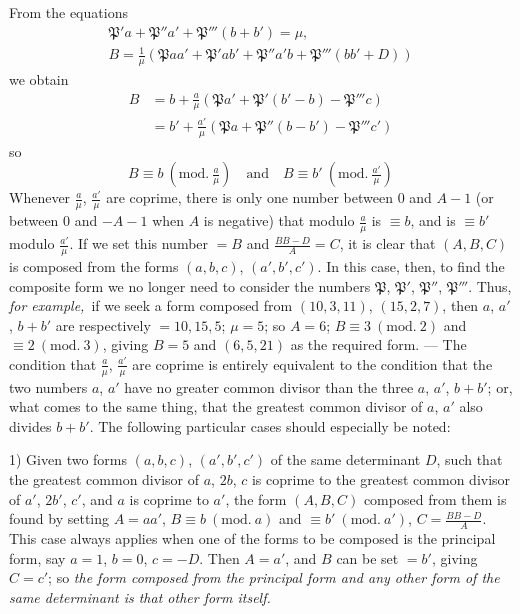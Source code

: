 From the equations
\[
\begin{gathered}\mathfrak{P}'a+\mathfrak{P}''a'+\mathfrak{P}'''(b+b')=\mu,\\
B=\frac{1}{\mu}(\mathfrak{P}aa'+\mathfrak{P}'ab'+\mathfrak{P}''a'b+\mathfrak{P}'''(bb'+D))\end{gathered}
\]
we obtain
\[
\begin{aligned}B&=b+\frac{a}{\mu}(\mathfrak{P}a'+\mathfrak{P}'(b'-b)-\mathfrak{P}'''c)\\&=b'+\frac{a'}{\mu}(\mathfrak{P}a+\mathfrak{P}''(b-b')-\mathfrak{P}'''c')\end{aligned}
\]
so
\[
B\equiv b\ (\mathrm{mod.}\ \tfrac{a}{\mu})\quad\text{and}\quad B\equiv b'\ (\mathrm{mod.}\ \tfrac{a'}{\mu})
\]
Whenever $\frac{a}{\mu}$, $\frac{a'}{\mu}$ are coprime, there is only one number between $0$ and $A-1$ (or between $0$ and $-A-1$ when $A$ is negative) that modulo $\frac{a}{\mu}$ is $\equiv b$, and is $\equiv b'$ modulo $\frac{a'}{\mu}$. If we set this number $=B$ and $\frac{BB-D}{A}=C$, it is clear that $(A,B,C)$ is composed from the forms $(a,b,c)$, $(a',b',c')$. In this case, then, to find the composite form we no longer need to consider the numbers $\mathfrak{P}$, $\mathfrak{P}'$, $\mathfrak{P}''$, $\mathfrak{P}'''$. Thus, \textit{for example,}\ if we seek a form composed from $(10,3,11)$, $(15,2,7)$, then $a$, $a'$, $b+b'$ are respectively $=10,15,5$; $\mu=5$; so $A=6$; $B\equiv3\ (\mathrm{mod.}\ 2)$ and $\equiv2\ (\mathrm{mod.}\ 3)$, giving $B=5$ and $(6,5,21)$ as the required form. --- The condition that $\frac{a}{\mu}$, $\frac{a'}{\mu}$ are coprime is entirely equivalent to the condition that the two numbers $a$, $a'$ have no greater common divisor than the three $a$, $a'$, $b+b'$; or, what comes to the same thing, that the greatest common divisor of $a$, $a'$ also divides $b+b'$. The following particular cases should especially be noted:

1) Given two forms $(a,b,c)$, $(a',b',c')$ of the same determinant $D$, such that the greatest common divisor of $a$, $2b$, $c$ is coprime to the greatest common divisor of $a'$, $2b'$, $c'$, and $a$ is coprime to $a'$, the form $(A,B,C)$ composed from them is found by setting $A=aa'$, $B\equiv b\ (\mathrm{mod.}\ a)$ and $\equiv b'\ (\mathrm{mod.}\ a')$, $C=\frac{BB-D}{A}$. This case always applies when one of the forms to be composed is the principal form, say $a=1$, $b=0$, $c=-D$. Then $A=a'$, and $B$ can be set
$=b'$, giving $C=c'$; so \textit{the form composed from the principal form and any other form of the same determinant is that other form itself.}

